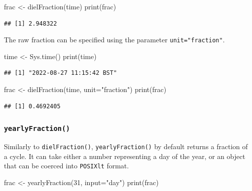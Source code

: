 \documentclass[
]{book}
\newenvironment{Shaded}{\begin{snugshade}}{\end{snugshade}}
\newcommand{\AttributeTok}[1]{\textcolor[rgb]{0.77,0.63,0.00}{#1}}
\newcommand{\DecValTok}[1]{\textcolor[rgb]{0.00,0.00,0.81}{#1}}
\newcommand{\FunctionTok}[1]{\textcolor[rgb]{0.00,0.00,0.00}{#1}}
\newcommand{\NormalTok}[1]{#1}
\newcommand{\OtherTok}[1]{\textcolor[rgb]{0.56,0.35,0.01}{#1}}
\newcommand{\StringTok}[1]{\textcolor[rgb]{0.31,0.60,0.02}{#1}}
\begin{document}
\begin{Shaded}
\begin{Highlighting}[]
\NormalTok{frac }\OtherTok{\textless{}{-}} \FunctionTok{dielFraction}\NormalTok{(time)}
\FunctionTok{print}\NormalTok{(frac)}
\end{Highlighting}
\end{Shaded}

\begin{verbatim}
## [1] 2.948322
\end{verbatim}

The raw fraction can be specified using the parameter \texttt{unit="fraction"}.

\begin{Shaded}
\begin{Highlighting}[]
\NormalTok{time }\OtherTok{\textless{}{-}} \FunctionTok{Sys.time}\NormalTok{()}
\FunctionTok{print}\NormalTok{(time)}
\end{Highlighting}
\end{Shaded}

\begin{verbatim}
## [1] "2022-08-27 11:15:42 BST"
\end{verbatim}

\begin{Shaded}
\begin{Highlighting}[]
\NormalTok{frac }\OtherTok{\textless{}{-}} \FunctionTok{dielFraction}\NormalTok{(time, }\AttributeTok{unit=}\StringTok{"fraction"}\NormalTok{)}
\FunctionTok{print}\NormalTok{(frac)}
\end{Highlighting}
\end{Shaded}

\begin{verbatim}
## [1] 0.4692405
\end{verbatim}

\hypertarget{yearlyfraction}{%
\subsubsection{\texorpdfstring{\texttt{yearlyFraction()}}{yearlyFraction()}}\label{yearlyfraction}}

Similarly to \texttt{dielFraction()}, \texttt{yearlyFraction()} by default returns a fraction of a cycle. It can take either a number representing a day of the year, or an object that can be coerced into \texttt{POSIXlt} format.

\begin{Shaded}
\begin{Highlighting}[]
\NormalTok{frac }\OtherTok{\textless{}{-}} \FunctionTok{yearlyFraction}\NormalTok{(}\DecValTok{31}\NormalTok{, }\AttributeTok{input=}\StringTok{"day"}\NormalTok{)}
\FunctionTok{print}\NormalTok{(frac)}
\end{Highlighting}
\end{Shaded}
\end{document}
